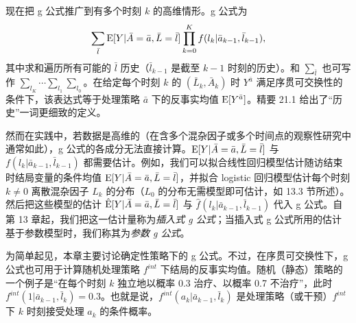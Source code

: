 现在把 g 公式推广到有多个时刻 $k$ 的高维情形。g 公式为
\[
\sum_{\bar l}\mathrm{E}[Y|\bar A=\bar a,\bar L=\bar l]\prod_{k=0}^{K}f(l_k|\bar a_{k-1},\bar l_{k-1}),
\]
其中求和遍历所有可能的 $\bar l$ 历史（$\bar l_{k-1}$ 是截至 $k-1$ 时刻的历史）。和 $\sum_{\bar l}$ 也可写作 $\sum_{l_K}\cdots\sum_{l_1}\sum_{l_0}$。在给定每个时刻 $k$ 的 $(\bar L_k,\bar A_k)$ 时 $Y^{\bar a}$ 满足序贯可交换性的条件下，该表达式等于处理策略 $\bar a$ 下的反事实均值 $\mathrm{E}[Y^{\bar a}]$。精要 21.1 给出了“历史”一词更细致的定义。


然而在实践中，若数据是高维的（在含多个混杂因子或多个时间点的观察性研究中通常如此），g 公式的各成分无法直接计算。$\mathrm{E}[Y|\bar A=\bar a,\bar L=\bar l]$ 与 $f(l_k|\bar a_{k-1},\bar l_{k-1})$ 都需要估计。例如，我们可以拟合线性回归模型估计随访结束时结局变量的条件均值 $\mathrm{E}[Y|\bar A=\bar a,\bar L=\bar l]$，并拟合 logistic 回归模型估计每个时刻 $k\neq0$ 离散混杂因子 $L_k$ 的分布（$L_0$ 的分布无需模型即可估计，如 13.3 节所述）。然后把这些模型的估计 $\hat{\mathrm{E}}[Y|\bar A=\bar a,\bar L=\bar l]$ 与 $\hat f(l_k|\bar a_{k-1},\bar l_{k-1})$ 代入 g 公式。自第 13 章起，我们把这一估计量称为\emph{插入式 g 公式}；当插入式 g 公式所用的估计基于参数模型时，我们称其为\emph{参数 g 公式}。

为简单起见，本章主要讨论确定性策略下的 g 公式。不过，在序贯可交换性下，g 公式也可用于计算随机处理策略 $f^{int}$ 下结局的反事实均值。随机（静态）策略的一个例子是“在每个时刻 $k$ 独立地以概率 0.3 治疗、以概率 0.7 不治疗”，此时 $f^{int}(1|\bar a_{k-1},\bar l_k)=0.3$。也就是说，$f^{int}(a_k|\bar a_{k-1},\bar l_k)$ 是处理策略（或干预）$f^{int}$ 下 $k$ 时刻接受处理 $a_k$ 的条件概率。

